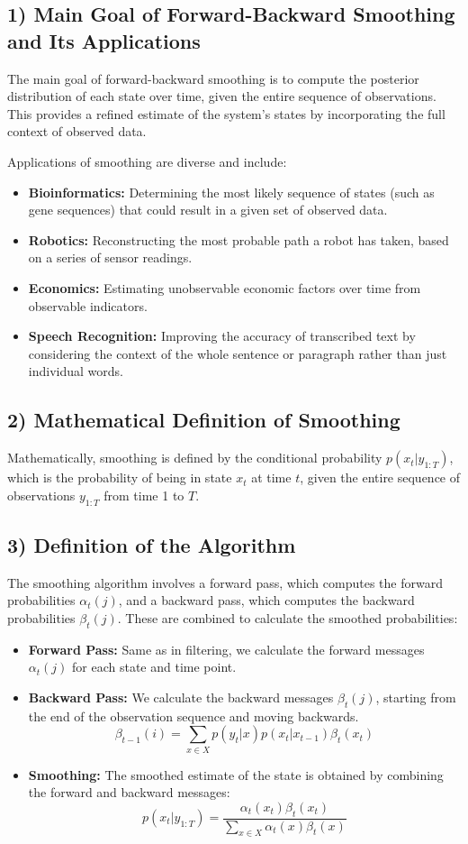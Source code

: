 \documentclass[10pt]{article}
\begin{document}
\subsection*{1) Main Goal of Forward-Backward Smoothing and Its Applications}
The main goal of forward-backward smoothing is to compute the posterior distribution of each state over time, given the entire sequence of observations. This provides a refined estimate of the system's states by incorporating the full context of observed data.

Applications of smoothing are diverse and include:

\begin{itemize}
  \item \textbf{Bioinformatics:} Determining the most likely sequence of states (such as gene sequences) that could result in a given set of observed data.
  \item \textbf{Robotics:} Reconstructing the most probable path a robot has taken, based on a series of sensor readings.
  \item \textbf{Economics:} Estimating unobservable economic factors over time from observable indicators.
  \item \textbf{Speech Recognition:} Improving the accuracy of transcribed text by considering the context of the whole sentence or paragraph rather than just individual words.
\end{itemize}

\subsection*{2) Mathematical Definition of Smoothing}
Mathematically, smoothing is defined by the conditional probability \( p(x_t | y_{1:T}) \), which is the probability of being in state \( x_t \) at time \( t \), given the entire sequence of observations \( y_{1:T} \) from time 1 to \( T \).

\subsection*{3) Definition of the Algorithm}
The smoothing algorithm involves a forward pass, which computes the forward probabilities \( \alpha_t(j) \), and a backward pass, which computes the backward probabilities \( \beta_t(j) \). These are combined to calculate the smoothed probabilities:

\begin{itemize}
  \item \textbf{Forward Pass:} Same as in filtering, we calculate the forward messages \( \alpha_t(j) \) for each state and time point.
  \item \textbf{Backward Pass:} We calculate the backward messages \( \beta_t(j) \), starting from the end of the observation sequence and moving backwards.
\[ \beta_{t-1}(i) = \sum_{x \in X} p(y_t|x) p(x_t|x_{t-1}) \beta_t(x_t) \]
  \item \textbf{Smoothing:} The smoothed estimate of the state is obtained by combining the forward and backward messages:
\[ p(x_t | y_{1:T}) = \frac{\alpha_t(x_t) \beta_t(x_t)}{\sum_{x \in X} \alpha_t(x) \beta_t(x)} \]
\end{itemize}
\end{document}

